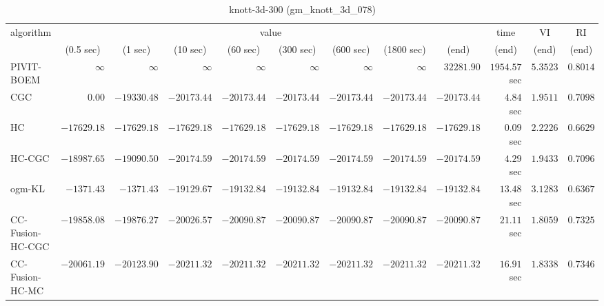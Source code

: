 \begin{table}[H]
\scriptsize
\centering
\caption{knott-3d-300 (gm\_knott\_3d\_078)}
\label{tab:anytimetable-knott-3d-300-gm-knott-3d-078}
\begin{tabular}{lrrrrrrrrrrr}
\toprule
           algorithm &                                   \multicolumn{8}{c}{value} & \multicolumn{1}{c}{time}    & \multicolumn{1}{c}{VI}  & \multicolumn{1}{c}{RI} \\  
\cmidrule(lr){2-9}\cmidrule(lr){10-10} \cmidrule(lr){11-11} \cmidrule(lr){12-12}   
                     & \multicolumn{1}{c}{(0.5 sec)} & \multicolumn{1}{c}{(1 sec)} & \multicolumn{1}{c}{(10 sec)} & \multicolumn{1}{c}{(60 sec)} & \multicolumn{1}{c}{(300 sec)} & \multicolumn{1}{c}{(600 sec)} & \multicolumn{1}{c}{(1800 sec)} & \multicolumn{1}{c}{(end)} & \multicolumn{1}{c}{(end)}    & \multicolumn{1}{c}{(end)}   & \multicolumn{1}{c}{(end)}  \\ \midrule 
          PIVIT-BOEM & $\infty$ & $\infty$ & $\infty$ & $\infty$ & $\infty$ & $\infty$ & $\infty$ & $     32281.90$ & $      1954.57$ sec    & $       5.3523$  & $       0.8014$ \\ 
                 CGC & $         0.00$ & $    -19330.48$ & $    -20173.44$ & $    -20173.44$ & $    -20173.44$ & $    -20173.44$ & $    -20173.44$ & $    -20173.44$ & $         4.84$ sec    & $       1.9511$  & $       0.7098$ \\ 
                  HC & $    -17629.18$ & $    -17629.18$ & $    -17629.18$ & $    -17629.18$ & $    -17629.18$ & $    -17629.18$ & $    -17629.18$ & $    -17629.18$ & $         0.09$ sec    & $       2.2226$  & $       0.6629$ \\ 
              HC-CGC & $    -18987.65$ & $    -19090.50$ & $    -20174.59$ & $    -20174.59$ & $    -20174.59$ & $    -20174.59$ & $    -20174.59$ & $    -20174.59$ & $         4.29$ sec    & $       1.9433$  & $       0.7096$ \\ 
              ogm-KL & $     -1371.43$ & $     -1371.43$ & $    -19129.67$ & $    -19132.84$ & $    -19132.84$ & $    -19132.84$ & $    -19132.84$ & $    -19132.84$ & $        13.48$ sec    & $       3.1283$  & $       0.6367$ \\ 
    CC-Fusion-HC-CGC & $    -19858.08$ & $    -19876.27$ & $    -20026.57$ & $    -20090.87$ & $    -20090.87$ & $    -20090.87$ & $    -20090.87$ & $    -20090.87$ & $        21.11$ sec    & $       1.8059$  & $       0.7325$ \\ 
     CC-Fusion-HC-MC & $    -20061.19$ & $    -20123.90$ & $    -20211.32$ & $    -20211.32$ & $    -20211.32$ & $    -20211.32$ & $    -20211.32$ & $    -20211.32$ & $        16.91$ sec    & $       1.8338$  & $       0.7346$ \\ 

\end{tabular}
\end{table}
